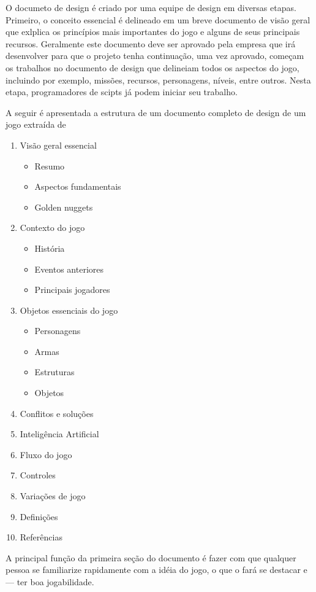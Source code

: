 O documeto de design é criado por uma equipe de design em diversas etapas. Primeiro, o conceito essencial é delineado em um breve documento de visão geral que exlplica os princípios mais importantes do jogo e alguns de seus principais recursos.
Geralmente este documento deve ser aprovado pela empresa que irá desenvolver para que o projeto tenha continuação, uma vez aprovado, começam os trabalhos no documento de design que delineiam todos os aspectos do jogo, incluindo por exemplo, missões, recursos, personagens, níveis, entre outros. Nesta etapa, programadores de scipts já podem iniciar seu trabalho.

A seguir é apresentada a estrutura de um documento completo de design de um jogo extraída de \cite{design_games}

\begin{enumerate}
\item Visão geral essencial
\begin{itemize}
\item Resumo
\item Aspectos fundamentais
\item Golden nuggets
\end{itemize}
\item Contexto do jogo
\begin{itemize}
\item História
\item Eventos anteriores
\item Principais jogadores
\end{itemize}
\item Objetos essenciais do jogo
\begin{itemize}
\item Personagens
\item Armas
\item Estruturas
\item Objetos
\end{itemize}
\item Conflitos e soluções
\item Inteligência Artificial
\item Fluxo do jogo
\item Controles
\item Variações de jogo
\item Definições
\item Referências
\end{enumerate}


A principal função da primeira seção do documento é fazer com que qualquer pessoa se familiarize rapidamente com a idéia do jogo, o que o fará se destacar e --- ter boa jogabilidade.
